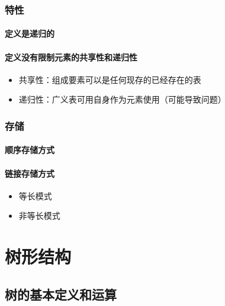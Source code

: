 \documentclass[AutoFakeBold]{LZUThesis2007}
\begin{document}
		\subsection{特性}
			\subsubsection{定义是递归的}
			\subsubsection{定义没有限制元素的共享性和递归性}
\begin{itemize}
	\item 共享性：组成要素可以是任何现存的已经存在的表
	\item 递归性：广义表可用自身作为元素使用（可能导致问题）
\end{itemize}

		\subsection{存储}
			\subsubsection{顺序存储方式}
			\subsubsection{链接存储方式}
\begin{itemize}
	\item 等长模式
	\item 非等长模式
\end{itemize}

\chapter{树形结构}
	\section{树的基本定义和运算}
\end{document}
